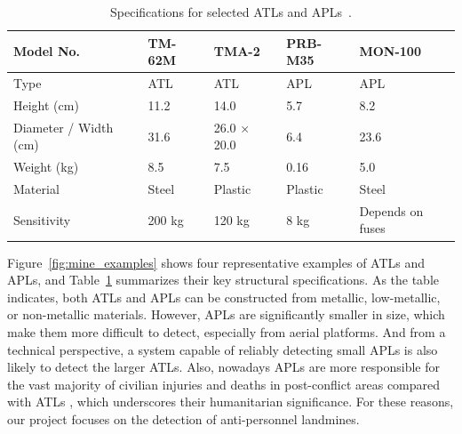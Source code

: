 \begin{table}[h]
    \centering
    \small
    \renewcommand{\arraystretch}{1.3}
    \caption{Specifications for selected ATLs and APLs~\cite{paik2002image}.}
    \label{tab:mine_specs}
    \begin{tabular}{l p{2.8cm} p{2.8cm} p{2.8cm} p{2.8cm}}
        \toprule
        \textbf{Model No.} & \textbf{TM-62M} & \textbf{TMA-2} & \textbf{PRB-M35} & \textbf{MON-100} \\
        \midrule
        Type & ATL & ATL & APL & APL \\
        Height (cm) & 11.2 & 14.0 & 5.7 & 8.2 \\
        Diameter / Width (cm) & 31.6 & 26.0 × 20.0 & 6.4 & 23.6 \\
        Weight (kg) & 8.5 & 7.5 & 0.16 & 5.0 \\
        Material & Steel & Plastic & Plastic & Steel \\
        Sensitivity & 200 kg & 120 kg & 8 kg & Depends on fuses \\
        \bottomrule
    \end{tabular}
\end{table}

Figure~\ref{fig:mine_examples} shows four representative examples of ATLs and APLs, and Table~\ref{tab:mine_specs} summarizes their key structural specifications. As the table indicates, both ATLs and APLs can be constructed from metallic, low-metallic, or non-metallic materials. However, APLs are significantly smaller in size, which make them more difficult to detect, especially from aerial platforms. And from a technical perspective, a system capable of reliably detecting small APLs is also likely to detect the larger ATLs. Also, nowadays APLs are more responsible for the vast majority of civilian injuries and deaths in post-conflict areas compared with ATLs \cite{unmas2021handbook}, which underscores their humanitarian significance. For these reasons, our project focuses on the detection of anti-personnel landmines.
